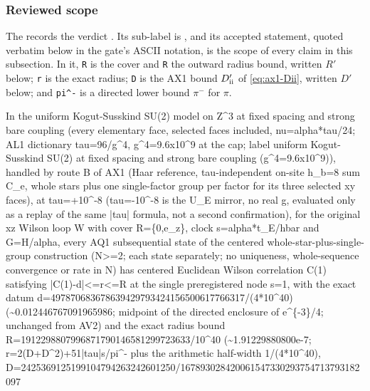 \subsubsection{Reviewed scope}
\label{sec:ax2-scope}
The  records the
verdict . Its sub-label is
, and its accepted statement, quoted verbatim
below in the gate's ASCII notation, is the scope of every claim in this
subsection. In it, \texttt{R} is the cover and \texttt{R\textquotesingle{}} the outward
radius bound, written $R'$ below; \texttt{r} is the exact radius;
\texttt{D\textquotesingle{}} is the AX1 bound $D'_{\rm ii}$ of
\eqref{eq:ax1-Dii}, written $D'$ below; and \texttt{pi\textasciicircum{}-} is
a directed lower bound $\pi^-$ for $\pi$.
\begin{gatequote}
In the uniform Kogut-Susskind SU(2) model on Z\textasciicircum{}3 at fixed
spacing and strong bare coupling (every elementary face, selected faces
included, nu=alpha*tau/24; AL1 dictionary tau=96/g\textasciicircum{}4,
g\textasciicircum{}4=9.6x10\textasciicircum{}9 at the cap; label
\textquotesingle{}uniform Kogut-Susskind SU(2) at fixed spacing and strong
bare coupling
(g\textasciicircum{}4=9.6x10\textasciicircum{}9)\textquotesingle{}), handled
by route B of AX1 (Haar reference, tau-independent on-site h\_b=8 sum C\_e,
whole stars plus one single-factor group per factor for its three selected xy
faces), at tau=+10\textasciicircum{}-8 (tau=-10\textasciicircum{}-8 is the
U\_E mirror, no real g, evaluated only as a replay of the same |tau| formula,
not a second confirmation), for the original xz Wilson loop W with cover
R=\{0,e\_z\}, clock s=alpha*t\_E/hbar and G=H/alpha, every AQ1 subsequential
state of the centered whole-star-plus-single-group construction (N>=2; each
state separately; no uniqueness, whole-sequence convergence or rate in N) has
centered Euclidean Wilson correlation C(1) satisfying
|C(1)-d|<=r<=R\textquotesingle{} at the single preregistered node s=1, with
the exact datum
d=497870683678639429793424156500617766317/(4*10\textasciicircum{}40)
(\textasciitilde{}0.012446767091965986; midpoint of the directed enclosure of
e\textasciicircum{}\{-3\}/4; unchanged from AV2) and the exact radius bound
R\textquotesingle{}=1912298807996871790146581299723633/10\textasciicircum{}40
(\textasciitilde{}1.91229880800e-7;
r=2(D\textquotesingle{}+D\textquotesingle{}\textasciicircum{}2)+51|tau|s/pi\textasciicircum{}-
plus the arithmetic half-width 1/(4*10\textasciicircum{}40),
D\textquotesingle{}=2425369125199104794263242601250/167893028420061547330293754713793182097

\end{gatequote}
